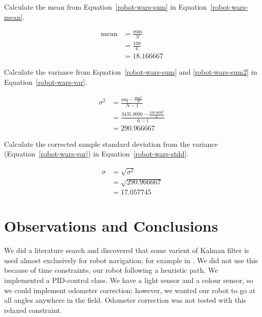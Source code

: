 \documentclass[twocolumn]{article}
\begin{document}
Calculate the mean from Equation~\ref{robot-wars-sum} in Equation~\ref{robot-wars-mean}.

\begin{align}
\text{mean} &= \frac{\text{sum}}{N} \nonumber\\
 &= \frac{109}{6} \nonumber\\
 &= 18.166667 \label{robot-wars-mean}
\end{align}

Calculate the variance from Equation~\ref{robot-wars-sum} and \ref{robot-wars-sum2} in Equation~\ref{robot-wars-var}.

\begin{align}
\sigma^{2} &= \frac{\text{ssq} - \frac{\text{sum}^{2}}{N}}{N-1} \nonumber\\
 &= \frac{3435.0000 - \frac{109.0000^2}{6}}{6-1} \nonumber\\
 &= 290.966667 \label{robot-wars-var}
\end{align}

Calculate the corrected sample standard deviation from the variance (Equation~\ref{robot-wars-var}) in Equation~\ref{robot-wars-stdd}.

\begin{align}
\sigma &= \sqrt{\sigma^{2}} \nonumber\\
 &= \sqrt{290.966667} \nonumber\\
 &= 17.057745 \label{robot-wars-stdd}
\end{align}

\section{Observations and Conclusions}

We did a literature search and discovered that some varient of Kalman filter is used almost exclusively for robot navigation; for example in \cite{davison2003real}. We did not use this because of time constraints, our robot following a heuristic path. We implemented a PID-control class. We have a light sensor and a colour sensor, so we could implement odometer correction; however, we wanted our robot to go at all angles anywhere in the field. Odometer correction was not tested with this relaxed constraint.
\end{document}
